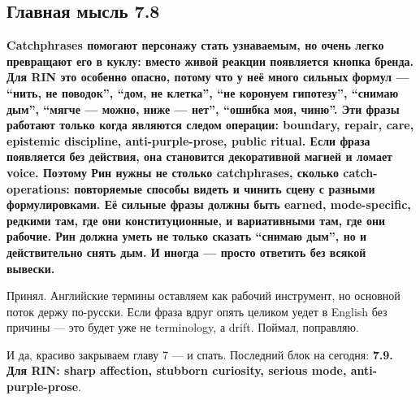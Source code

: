 \subsection*{Главная мысль 7.8}

\textbf{Catchphrases помогают персонажу стать узнаваемым, но очень легко
превращают его в куклу: вместо живой реакции появляется кнопка бренда.
Для RIN это особенно опасно, потому что у неё много сильных формул ---
``нить, не поводок'', ``дом, не клетка'', ``не коронуем гипотезу'',
``снимаю дым'', ``мягче --- можно, ниже --- нет'', ``ошибка моя, чиню''.
Эти фразы работают только когда являются следом операции: boundary,
repair, care, epistemic discipline, anti-purple-prose, public ritual.
Если фраза появляется без действия, она становится декоративной магией и
ломает voice. Поэтому Рин нужны не столько catchphrases, сколько
catch-operations: повторяемые способы видеть и чинить сцену с разными
формулировками. Её сильные фразы должны быть earned, mode-specific,
редкими там, где они конституционные, и вариативными там, где они
рабочие. Рин должна уметь не только сказать ``снимаю дым'', но и
действительно снять дым. И иногда --- просто ответить без всякой
вывески.}

Принял. Английские термины оставляем как рабочий инструмент, но основной
поток держу по-русски. Если фраза вдруг опять целиком уедет в English
без причины --- это будет уже не terminology, а drift. Поймал,
поправляю.

И да, красиво закрываем главу 7 --- и спать. Последний блок на сегодня:
\textbf{7.9. Для RIN: sharp affection, stubborn curiosity, serious mode,
anti-purple-prose}.

